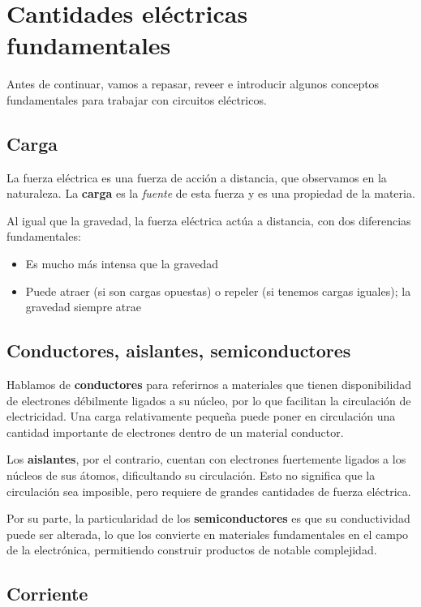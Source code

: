 
\section{Cantidades eléctricas fundamentales}

Antes de continuar,
vamos a repasar,
reveer e introducir algunos conceptos fundamentales para 
trabajar con circuitos eléctricos.

\subsection{Carga}

La fuerza eléctrica es una fuerza de acción a distancia,
que observamos en la naturaleza. 
La \textbf{carga} es la \textit{fuente} de esta fuerza
y es una propiedad de la materia.

Al igual que la gravedad,
la fuerza eléctrica actúa a distancia,
con dos diferencias fundamentales:
\begin{itemize}
    \item Es mucho más intensa que la gravedad
    \item Puede atraer (si son cargas opuestas) 
    o repeler (si tenemos cargas iguales); la gravedad siempre atrae
\end{itemize}

\subsection{Conductores, aislantes, semiconductores}

Hablamos de \textbf{conductores} para referirnos a materiales que 
tienen disponibilidad de electrones débilmente ligados a su núcleo,
por lo que facilitan la circulación de electricidad.
Una carga relativamente pequeña 
puede poner en circulación una cantidad importante de electrones
dentro de un material conductor.

Los \textbf{aislantes}, por el contrario, 
cuentan con electrones fuertemente ligados a los núcleos de sus átomos,
dificultando su circulación.
Esto no significa que la circulación sea imposible,
pero requiere de grandes cantidades de fuerza eléctrica.

Por su parte, 
la particularidad de los \textbf{semiconductores} 
es que su conductividad puede ser alterada,
lo que los convierte en materiales fundamentales en el campo de la electrónica,
permitiendo construir productos de notable complejidad.

\subsection{Corriente}

